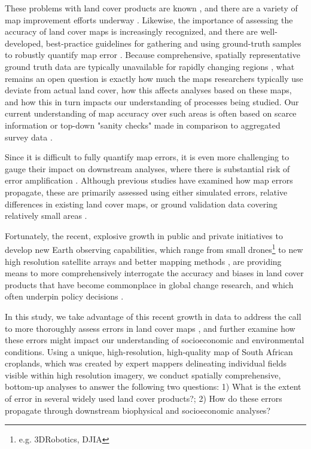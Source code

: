 \documentclass[12 pt, titlepage, a4paper]{article}
\begin{document}
These problems with land cover products are known \citep{fritz_comparison_2010, fritz_cropland_2011, see_improved_2015, fritz_mapping_2015,verburg_challenges_2011}, and there are a variety of map improvement efforts underway \citep[e.g.][]{fritz_geo-wiki:_2012, estes_platform_2016,fritz_mapping_2015}. Likewise, the importance of assessing the accuracy of land cover maps is increasingly recognized, and there are well-developed, best-practice guidelines for gathering and using ground-truth samples to robustly quantify map error \citep{foody_status_2002,olofsson_making_2013,olofsson_good_2014,stehman_global_2012}. Because comprehensive, spatially representative ground truth data are typically unavailable for rapidly changing regions \citep{see_improved_2015,kuemmerle_challenges_2013}, what remains an open question is exactly how much the maps researchers typically use deviate from actual land cover, how this affects analyses based on these maps, and how this in turn impacts our understanding of processes being studied.  Our current understanding of map accuracy over such areas is often based on scarce information or top-down "sanity checks" made in comparison to aggregated survey data \citep{yu_meta-discoveries_2014,larsen_taken_2015}.  

Since it is difficult to fully quantify map errors, it is even more challenging to gauge their impact on downstream analyses, where there is substantial risk of error amplification \citep{kuemmerle_challenges_2013}. Although previous studies have examined how map errors propagate, these are primarily assessed using either simulated errors, relative differences in existing land cover maps, or ground validation data covering relatively small areas \citep[e.g.][]{ge_impacts_2007, linard_assessing_2010, quaife_impact_2008, tuanmu_global_2014, schmit_limitations_2006}. 

Fortunately, the recent, explosive growth in public and private initiatives to develop new Earth observing capabilities, which range from small drones\footnote{e.g. 3DRobotics, DJIA} to new high resolution satellite arrays \citep{drusch_sentinel-2:_2012,hand_startup_2015} and better mapping methods \citep{fritz_geo-wiki:_2012,estes_projected_2013,debats_generalized_2016}, are providing means to more comprehensively interrogate the accuracy and biases in land cover products that have become commonplace in global change research, and which often underpin policy decisions \citep{searchinger_high_2015}.  

In this study, we take advantage of this recent growth in data to address the call to more thoroughly assess errors in land cover maps \citep{kuemmerle_challenges_2013, olofsson_good_2014,olofsson_global_2012}, and further examine how these errors might impact our understanding of socioeconomic and environmental conditions. Using a unique, high-resolution, high-quality map of South African croplands, which was created by expert mappers delineating individual fields visible within high resolution imagery, we conduct spatially comprehensive, bottom-up analyses to answer the following two questions: 1) What is the extent of error in several widely used land cover products?; 2) How do these errors propagate through downstream biophysical and socioeconomic analyses? 
\end{document}

